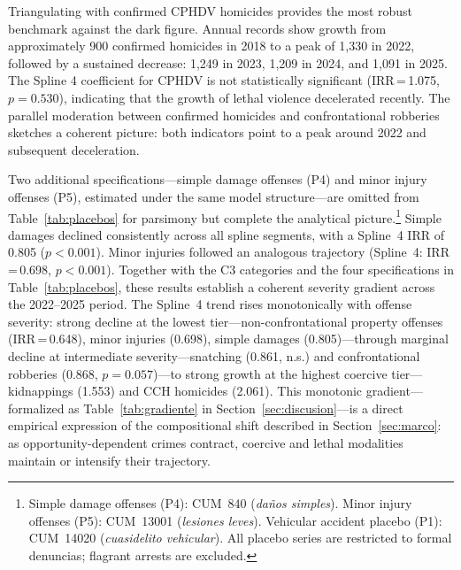 \documentclass[pdflatex,sn-basic]{sn-jnl}
\begin{document}
Triangulating with confirmed CPHDV homicides provides the most robust benchmark against the dark figure. Annual records show growth from approximately 900 confirmed homicides in 2018 to a peak of 1,330 in 2022, followed by a sustained decrease: 1,249 in 2023, 1,209 in 2024, and 1,091 in 2025. The Spline 4 coefficient for CPHDV is not statistically significant (IRR\,=\,1.075, $p=0.530$), indicating that the growth of lethal violence decelerated recently. The parallel moderation between confirmed homicides and confrontational robberies sketches a coherent picture: both indicators point to a peak around 2022 and subsequent deceleration.

Two additional specifications---simple damage offenses (P4) and minor injury offenses (P5), estimated under the same model structure---are omitted from Table~\ref{tab:placebos} for parsimony but complete the analytical picture.\footnote{Simple damage offenses (P4): CUM~840 (\textit{da\~nos simples}). Minor injury offenses (P5): CUM~13001 (\textit{lesiones leves}). Vehicular accident placebo (P1): CUM~14020 (\textit{cuasidelito vehicular}). All placebo series are restricted to formal denuncias; flagrant arrests are excluded.} Simple damages declined consistently across all spline segments, with a Spline~4 IRR of 0.805 ($p<0.001$). Minor injuries followed an analogous trajectory (Spline~4: IRR\,=\,0.698, $p<0.001$). Together with the C3 categories and the four specifications in Table~\ref{tab:placebos}, these results establish a coherent severity gradient across the 2022--2025 period. The Spline~4 trend rises monotonically with offense severity: strong decline at the lowest tier---non-confrontational property offenses (IRR\,=\,0.648), minor injuries (0.698), simple damages (0.805)---through marginal decline at intermediate severity---snatching (0.861, n.s.) and confrontational robberies (0.868, $p=0.057$)---to strong growth at the highest coercive tier---kidnappings (1.553) and CCH homicides (2.061). This monotonic gradient---formalized as Table~\ref{tab:gradiente} in Section~\ref{sec:discusion}---is a direct empirical expression of the compositional shift described in Section~\ref{sec:marco}: as opportunity-dependent crimes contract, coercive and lethal modalities maintain or intensify their trajectory.
\end{document}
